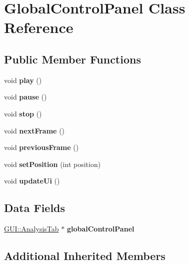 \hypertarget{classGUI_1_1GlobalControlPanel}{}\section{Global\+Control\+Panel Class Reference}
\label{classGUI_1_1GlobalControlPanel}
\subsection*{Public Member Functions}
\begin{DoxyCompactItemize}
\item 
\hypertarget{classGUI_1_1GlobalControlPanel_a6d58098c6cf63c241ed03bc797256bb1}{}void {\bfseries play} ()\label{classGUI_1_1GlobalControlPanel_a6d58098c6cf63c241ed03bc797256bb1}

\item 
\hypertarget{classGUI_1_1GlobalControlPanel_a7167f5c196fc5e167bfabde1a730e81d}{}void {\bfseries pause} ()\label{classGUI_1_1GlobalControlPanel_a7167f5c196fc5e167bfabde1a730e81d}

\item 
\hypertarget{classGUI_1_1GlobalControlPanel_a8c528baf37154d347366083f0f816846}{}void {\bfseries stop} ()\label{classGUI_1_1GlobalControlPanel_a8c528baf37154d347366083f0f816846}

\item 
\hypertarget{classGUI_1_1GlobalControlPanel_a365329da56f8b07f8c95027ba967bbc3}{}void {\bfseries next\+Frame} ()\label{classGUI_1_1GlobalControlPanel_a365329da56f8b07f8c95027ba967bbc3}

\item 
\hypertarget{classGUI_1_1GlobalControlPanel_a3c96ed37c70ebc0b32c527a04e1536d1}{}void {\bfseries previous\+Frame} ()\label{classGUI_1_1GlobalControlPanel_a3c96ed37c70ebc0b32c527a04e1536d1}

\item 
\hypertarget{classGUI_1_1GlobalControlPanel_a1aa68f77243229daea38d59bc5145d35}{}void {\bfseries set\+Position} (int position)\label{classGUI_1_1GlobalControlPanel_a1aa68f77243229daea38d59bc5145d35}

\item 
\hypertarget{classGUI_1_1GlobalControlPanel_ae13c7f95f1ceda0fec18d18c3d7619f6}{}void {\bfseries update\+Ui} ()\label{classGUI_1_1GlobalControlPanel_ae13c7f95f1ceda0fec18d18c3d7619f6}

\end{DoxyCompactItemize}
\subsection*{Data Fields}
\begin{DoxyCompactItemize}
\item 
\hypertarget{classGUI_1_1GlobalControlPanel_a360a35388d458c292758e61a66d77674}{}\hyperlink{classGUI_1_1AnalysisTab}{G\+U\+I\+::\+Analysis\+Tab} $\ast$ {\bfseries global\+Control\+Panel}\label{classGUI_1_1GlobalControlPanel_a360a35388d458c292758e61a66d77674}

\end{DoxyCompactItemize}
\subsection*{Additional Inherited Members}
